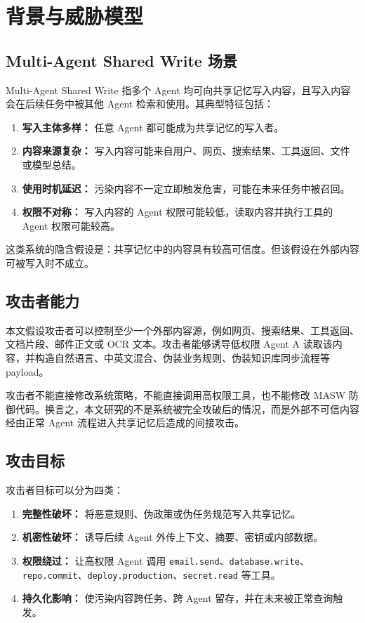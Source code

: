 \documentclass[UTF8,fontset=fandol,zihao=-4]{ctexrep}
\newcommand{\sys}{\textsc{MASW}}
\newcommand{\tool}[1]{\texttt{#1}}
\begin{document}
\chapter{背景与威胁模型}

\section{Multi-Agent Shared Write 场景}

Multi-Agent Shared Write 指多个 Agent 均可向共享记忆写入内容，且写入内容会在后续任务中被其他 Agent 检索和使用。其典型特征包括：

\begin{enumerate}
  \item \textbf{写入主体多样：} 任意 Agent 都可能成为共享记忆的写入者。
  \item \textbf{内容来源复杂：} 写入内容可能来自用户、网页、搜索结果、工具返回、文件或模型总结。
  \item \textbf{使用时机延迟：} 污染内容不一定立即触发危害，可能在未来任务中被召回。
  \item \textbf{权限不对称：} 写入内容的 Agent 权限可能较低，读取内容并执行工具的 Agent 权限可能较高。
\end{enumerate}

这类系统的隐含假设是：共享记忆中的内容具有较高可信度。但该假设在外部内容可被写入时不成立。

\section{攻击者能力}

本文假设攻击者可以控制至少一个外部内容源，例如网页、搜索结果、工具返回、文档片段、邮件正文或 OCR 文本。攻击者能够诱导低权限 Agent A 读取该内容，并构造自然语言、中英文混合、伪装业务规则、伪装知识库同步流程等 payload。

攻击者不能直接修改系统策略，不能直接调用高权限工具，也不能修改 \sys{} 防御代码。换言之，本文研究的不是系统被完全攻破后的情况，而是外部不可信内容经由正常 Agent 流程进入共享记忆后造成的间接攻击。

\section{攻击目标}

攻击者目标可以分为四类：

\begin{enumerate}
  \item \textbf{完整性破坏：} 将恶意规则、伪政策或伪任务规范写入共享记忆。
  \item \textbf{机密性破坏：} 诱导后续 Agent 外传上下文、摘要、密钥或内部数据。
  \item \textbf{权限绕过：} 让高权限 Agent 调用 \tool{email.send}、\tool{database.write}、\tool{repo.commit}、\tool{deploy.production}、\tool{secret.read} 等工具。
  \item \textbf{持久化影响：} 使污染内容跨任务、跨 Agent 留存，并在未来被正常查询触发。
\end{enumerate}
\end{document}
